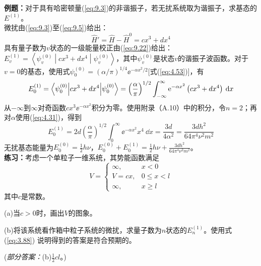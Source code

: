     \begin{examplebox}
        \textbf{例题：}对于具有哈密顿量(\ref{eq:9.3})的非谐振子，若无扰系统取为谐振子，求基态的$E^{(1)}$。
        \\

        微扰由(\ref{eq:9.3})至(\ref{eq:9.5})给出：
        \begin{equation*}
            \hat{H}' = \hat{H} - \hat{H}^0 = cx^3 + dx^4
        \end{equation*}
        具有量子数为$v$状态的一级能量校正由(\ref{eq:9.22})给出：$E_v^{(1)} = \left\langle \psi_v^{(0)} \middle| cx^3 + dx^4 \middle| \psi_v^{(0)} \right\rangle$，其中$\psi_v^{(0)}$是状态$v$的谐振子波函数。对于$v=0$的基态，使用式$\psi_0^{\left(0\right)} = \left(\alpha /\pi\right)^{1/4} \ee ^{-\alpha x^2 / 2}$[式(\ref{eq:4.53})]，有
        \begin{equation*}
            E_0^{\left(1\right)} = \left\langle \psi_0^{\left(0\right)} \middle| cx^3 + dx^4 \middle| \psi_0^{\left(0\right)} \right\rangle = \left(\frac{\alpha}{\pi}\right)^{1/2} \int_{-\infty}^{\infty} \mathrm{e} ^{-\alpha x^2} \left(cx^3 + dx^4\right) \:\dd x
        \end{equation*}
        从$-\infty$到$\infty$对奇函数$cx^3\ee ^{-\alpha x^2}$积分为零。使用附录（A.10）中的积分，令$n=2$；再对$\alpha$使用(\ref{eq:4.31})，得到
        \begin{equation*}
            E_0^{\left(1\right)} = 2d\left(\frac{\alpha}{\pi}\right)^{1/2} \int_{0}^{\infty} \ee ^{-\alpha x^2} x^4 \:\dd x = \frac{3d}{4\alpha^2} = \frac{3dh^2}{64\pi^4 \nu^2 m^2}
        \end{equation*}
        无扰基态能量为$E_0^{\left(0\right)} = \frac{1}{2}h\nu$，$E_0^{\left(0\right)} + E_0^{\left(1\right)} = \frac{1}{2}h\nu + \frac{3dh^2}{64\pi^4 \nu^2 m^2}$。
        \\

        \textbf{练习：}考虑一个单粒子一维系统，其势能函数满足
        \begin{equation*}
            V = \begin{cases}
                \infty, & x < 0 \\
                V = cx, & 0 \leq x < l \\
                \infty, & x \geq l
            \end{cases}
        \end{equation*}
        其中$c$是常数。

        (a)当$c>0$时，画出$V$的图象。

        (b)将该系统看作箱中粒子系统的微扰，求量子数为$n$状态的$E_n^{(1)}$。使用式 (\ref{eq:3.88}) 说明得到的答案是符合预期的。

        (\textit{部分答案：}(b)$\frac{1}{2}cl$。)
    \end{examplebox}

